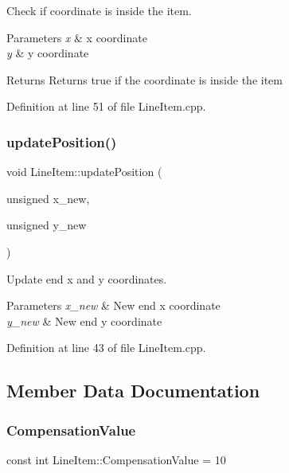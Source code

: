 Check if coordinate is inside the item. 


\begin{DoxyParams}{Parameters}
{\em x} & x coordinate \\
\hline
{\em y} & y coordinate \\
\hline
\end{DoxyParams}
\begin{DoxyReturn}{Returns}
Returns true if the coordinate is inside the item 
\end{DoxyReturn}


Definition at line 51 of file Line\+Item.\+cpp.

\mbox{\label{classLineItem_acea090c7b9ff53dcc7a95ab7939b2cb9}} 
\subsubsection{\texorpdfstring{update\+Position()}{updatePosition()}}
{\footnotesize\ttfamily void Line\+Item\+::update\+Position (\begin{DoxyParamCaption}\item[{unsigned}]{x\+\_\+new,  }\item[{unsigned}]{y\+\_\+new }\end{DoxyParamCaption})}



Update end x and y coordinates. 


\begin{DoxyParams}{Parameters}
{\em x\+\_\+new} & New end x coordinate \\
\hline
{\em y\+\_\+new} & New end y coordinate \\
\hline
\end{DoxyParams}


Definition at line 43 of file Line\+Item.\+cpp.



\subsection{Member Data Documentation}
\mbox{\label{classLineItem_af02da5c4e14746431c760eb075e3220e}} 
\subsubsection{\texorpdfstring{Compensation\+Value}{CompensationValue}}
{\footnotesize\ttfamily const int Line\+Item\+::\+Compensation\+Value = 10\hspace{0.3cm}{\ttfamily [static]}}

